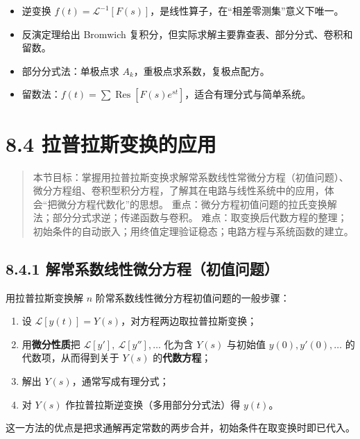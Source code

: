 \begin{itemize}
\tightlist
\item
  逆变换
  \(f(t)=\mathcal{L}^{-1}[F(s)]\)，是线性算子，在``相差零测集''意义下唯一。
\item
  反演定理给出 Bromwich
  复积分，但实际求解主要靠查表、部分分式、卷积和留数。
\item
  部分分式法：单极点求 \(A_k\)，重极点求系数，复极点配方。
\item
  留数法：\(f(t)=\sum\operatorname{Res}[F(s)e^{st}]\)，适合有理分式与简单系统。
\end{itemize}

\section{8.4
拉普拉斯变换的应用}\label{ux62c9ux666eux62c9ux65afux53d8ux6362ux7684ux5e94ux7528}

\begin{quote}
本节目标：掌握用拉普拉斯变换求解常系数线性常微分方程（初值问题）、微分方程组、卷积型积分方程，了解其在电路与线性系统中的应用，体会``把微分方程代数化''的思想。
重点：微分方程初值问题的拉氏变换解法；部分分式求逆；传递函数与卷积。
难点：取变换后代数方程的整理；初始条件的自动嵌入；用终值定理验证稳态；电路方程与系统函数的建立。
\end{quote}

\subsection{8.4.1
解常系数线性微分方程（初值问题）}\label{ux89e3ux5e38ux7cfbux6570ux7ebfux6027ux5faeux5206ux65b9ux7a0bux521dux503cux95eeux9898}

用拉普拉斯变换解 \(n\) 阶常系数线性微分方程初值问题的一般步骤：

\begin{enumerate}
\def\labelenumi{\arabic{enumi}.}
\tightlist
\item
  设 \(\mathcal{L}[y(t)]=Y(s)\)，对方程两边取拉普拉斯变换；
\item
  用\textbf{微分性质}把 \(\mathcal{L}[y'],\ \mathcal{L}[y''],\ldots\)
  化为含 \(Y(s)\) 与初始值 \(y(0),y'(0),\ldots\) 的代数项，从而得到关于
  \(Y(s)\) 的\textbf{代数方程}；
\item
  解出 \(Y(s)\)，通常写成有理分式；
\item
  对 \(Y(s)\) 作拉普拉斯逆变换（多用部分分式法）得 \(y(t)\)。
\end{enumerate}

这一方法的优点是把求通解再定常数的两步合并，初始条件在取变换时即已代入。

